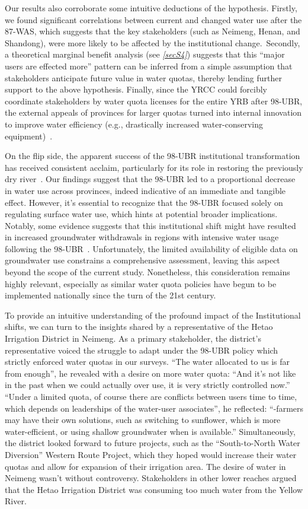 Our results also corroborate some intuitive deductions of the hypothesis.
Firstly, we found significant correlations between current and changed water use after the 87-WAS, which suggests that the key stakeholders (such as Neimeng, Henan, and Shandong), were more likely to be affected by the institutional change.\
Secondly, a theoretical marginal benefit analysis (see \textit{\ref{secS4}}) suggests that this ``major users are effected more'' pattern can be inferred from a simple assumption that stakeholders anticipate future value in water quotas, thereby lending further support to the above hypothesis.
Finally, since the YRCC could forcibly coordinate stakeholders by water quota licenses for the entire YRB after 98-UBR, the external appeals of provinces for larger quotas turned into internal innovation to improve water efficiency (e.g., drastically increased water-conserving equipment)~\cite{krieger1955, ostrom1990}.

On the flip side, the apparent success of the 98-UBR institutional transformation has received consistent acclaim, particularly for its role in restoring the previously dry river~\cite{wang2019e, wang2019d}.
Our findings suggest that the 98-UBR led to a proportional decrease in water use across provinces, indeed indicative of an immediate and tangible effect.
However, it's essential to recognize that the 98-UBR focused solely on regulating surface water use, which hints at potential broader implications.
Notably, some evidence suggests that this institutional shift might have resulted in increased groundwater withdrawals in regions with intensive water usage following the 98-UBR~\cite{sun2022b}.
Unfortunately, the limited availability of eligible data on groundwater use constrains a comprehensive assessment, leaving this aspect beyond the scope of the current study.
Nonetheless, this consideration remains highly relevant, especially as similar water quota policies have begun to be implemented nationally since the turn of the 21st century.

To provide an intuitive understanding of the profound impact of the Institutional shifts, we can turn to the insights shared by a representative of the Hetao Irrigation District in Neimeng.
As a primary stakeholder, the district's representative voiced the struggle to adapt under the 98-UBR policy which strictly enforced water quotas in our surveys.
``The water allocated to us is far from enough'', he revealed with a desire on more water quota: ``And it's not like in the past when we could actually over use, it is very strictly controlled now.''
``Under a limited quota, of course there are conflicts between users time to time, which depends on leaderships of the water-user associates'', he reflected: ``-farmers may have their own solutions, such as switching to sunflower, which is more water-efficient, or using shallow groundwater when is available.''
Simultaneously, the district looked forward to future projects, such as the ``South-to-North Water Diversion'' Western Route Project, which they hoped would increase their water quotas and allow for expansion of their irrigation area.
The desire of water in Neimeng wasn't without controversy. Stakeholders in other lower reaches argued that the Hetao Irrigation District was consuming too much water from the Yellow River.

